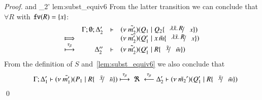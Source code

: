 \begin{proof}
%
	\noi and
%
	{\wb}
	{\Delta_2'}{}
	{lem:subst_equiv6}
%
%
%
	\noi From the latter transition we can conclude that $\forall R$ with $\mathtt{fv}(R) = \{x\}$:
%
	\[
		\begin{array}{crll}
			&\Gamma; \es; \Delta_2'& \proves & 
			\newsp{\tilde{m_2'}}{Q_1 \Par Q_2 \subst{\abs{\tilde{x}}{R}}{x}}\\
			\Hby{} & & &
			\newsp{\tilde{m_2'}}{Q_1' \Par \appl{x}{\tilde{m}} \subst{\abs{\tilde{x}}{R}}{x}} \\
			\hby{\btau}
			&\Delta_2''& \proves & \newsp{\tilde{m_2'}}{Q_1' \Par R \subst{\tilde{x}}{\tilde{m}}}%
		\end{array}
	\]
%
%
	\noi From the definition of $S$ and~\ref{lem:subst_equiv6}
	we also conclude that
	\begin{eqnarray*}
		&& \horel{\Gamma}
		{\Delta_1'}{\newsp{\tilde{m_1'}}{P_1 \Par R \subst{\tilde{x}}{\tilde{n}}}}
		{\hby{\btau}\ \Re\ \stackrel{\btau}{\longleftarrow}}
		{\Delta_2'}{\newsp{\tilde{m_2}'}{Q_1' \Par R \subst{\tilde{x}}{\tilde{m}}}}
	\end{eqnarray*}
%
%
%
	\qed
\begin{comment}
	\noi - Subcase: $\ell = \tau$.


\end{comment}
\end{proof}
